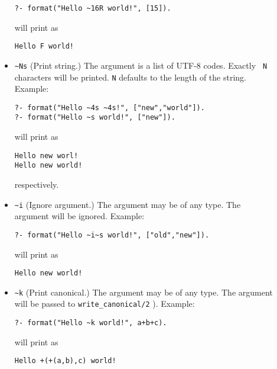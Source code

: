 \begin{description}
\begin{itemize}
{\begin{verbatim}
?- format("Hello ~16R world!", [15]).
\end{verbatim}

\noindent
will print as

\begin{verbatim}
Hello F world!
\end{verbatim}

}

\item \verb|~Ns|
(Print string.) The argument is a list of UTF-8 codes.  Exactly {\tt
N} characters will be printed. {\tt N} defaults to the length of the
string.  Example:

\begin{verbatim}
?- format("Hello ~4s ~4s!", ["new","world"]).
?- format("Hello ~s world!", ["new"]).
\end{verbatim}

\noindent
will print as

\begin{verbatim}
Hello new worl!
Hello new world!
\end{verbatim}

\noindent
respectively.

\item \verb|~i|
(Ignore argument.) The argument may be of any type.  The argument will be
ignored.  Example:  

\begin{verbatim}
?- format("Hello ~i~s world!", ["old","new"]).
\end{verbatim}

\noindent
will print as

\begin{verbatim}
Hello new world!
\end{verbatim}

\item \verb|~k|
(Print canonical.) The argument may be of any type.  The argument will be
passed to {\tt write\_canonical/2} ).  Example:  

\begin{verbatim}
?- format("Hello ~k world!", a+b+c).
\end{verbatim}

\noindent
will print as

\begin{verbatim}
Hello +(+(a,b),c) world!
\end{verbatim}


\end{itemize}
\end{description}
